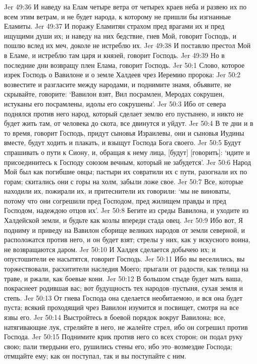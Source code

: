 Jer 49:36  И наведу на Елам четыре ветра от четырех краев неба и развею их по всем этим ветрам, и не будет народа, к которому не пришли бы изгнанные Еламиты.
Jer 49:37  И поражу Еламитян страхом пред врагами их и пред ищущими души их; и наведу на них бедствие, гнев Мой, говорит Господь, и пошлю вслед их меч, доколе не истреблю их.
Jer 49:38  И поставлю престол Мой в Еламе, и истреблю там царя и князей, говорит Господь.
Jer 49:39  Но в последние дни возвращу плен Елама, говорит Господь.
Jer 50:1  Слово, которое изрек Господь о Вавилоне и о земле Халдеев чрез Иеремию пророка:
Jer 50:2  возвестите и разгласите между народами, и поднимите знамя, объявите, не скрывайте, говорите: `Вавилон взят, Вил посрамлен, Меродах сокрушен, истуканы его посрамлены, идолы его сокрушены'.
Jer 50:3  Ибо от севера поднялся против него народ, который сделает землю его пустынею, и никто не будет жить там, от человека до скота, все двинутся и уйдут.
Jer 50:4  В те дни и в то время, говорит Господь, придут сыновья Израилевы, они и сыновья Иудины вместе, будут ходить и плакать, и взыщут Господа Бога своего.
Jer 50:5  Будут спрашивать о пути к Сиону, и, обращая к нему лица, [будут] [говорить]: `идите и присоединитесь к Господу союзом вечным, который не забудется'.
Jer 50:6  Народ Мой был как погибшие овцы; пастыри их совратили их с пути, разогнали их по горам; скитались они с горы на холм, забыли ложе свое.
Jer 50:7  Все, которые находили их, пожирали их, и притеснители их говорили: `мы не виноваты, потому что они согрешили пред Господом, пред жилищем правды и пред Господом, надеждою отцов их'.
Jer 50:8  Бегите из среды Вавилона, и уходите из Халдейской земли, и будьте как козлы впереди стада овец.
Jer 50:9  Ибо вот, Я подниму и приведу на Вавилон сборище великих народов от земли северной, и расположатся против него, и он будет взят; стрелы у них, как у искусного воина, не возвращаются даром.
Jer 50:10  И Халдея сделается добычею их; и опустошители ее насытятся, говорит Господь.
Jer 50:11  Ибо вы веселились, вы торжествовали, расхитители наследия Моего; прыгали от радости, как телица на траве, и ржали, как боевые кони.
Jer 50:12  В большом стыде будет мать ваша, покраснеет родившая вас; вот будущность тех народов--пустыня, сухая земля и степь.
Jer 50:13  От гнева Господа она сделается необитаемою, и вся она будет пуста; всякий проходящий чрез Вавилон изумится и посвищет, смотря на все язвы его.
Jer 50:14  Выстройтесь в боевой порядок вокруг Вавилона; все, натягивающие лук, стреляйте в него, не жалейте стрел, ибо он согрешил против Господа.
Jer 50:15  Поднимите крик против него со всех сторон; он подал руку свою; пали твердыни его, рушились стены его, ибо это--возмездие Господа; отмщайте ему; как он поступал, так и вы поступайте с ним.
